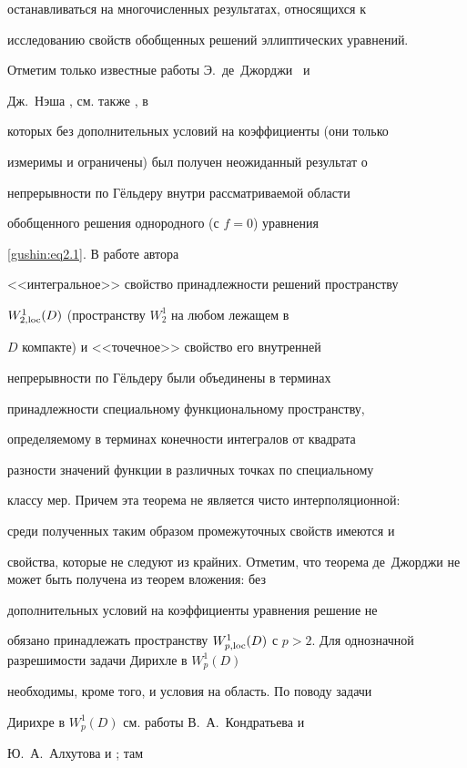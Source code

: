 останавливаться на многочисленных результатах, относящихся к

исследованию свойств обобщенных решений эллиптических уравнений.

Отметим только известные работы Э.~де~Джорджи~\cite{gushin:G} и

Дж.~Нэша \cite{gushin:Nash}, см. также \cite{gushin:Mos},  в

которых без дополнительных условий на коэффициенты (они только

измеримы и ограничены) был получен неожиданный результат о

непрерывности по Гёльдеру внутри рассматриваемой области

обобщенного решения однородного (с $f = 0$) уравнения

\eqref{gushin:eq2.1}. В работе автора \cite{gushin:GSM05}

<<интегральное>> свойство принадлежности решений пространству

$W_{2, {\rm loc}}^1 (D)$ (пространству $W_2^1$ на любом лежащем в

$D$ компакте) и <<точечное>>  свойство его внутренней

непрерывности по Гёльдеру были объединены в терминах

принадлежности специальному функциональному пространству,

определяемому в терминах конечности интегралов от квадрата

разности значений функции в различных точках по специальному

классу мер. Причем эта теорема не является чисто интерполяционной:

среди полученных таким образом промежуточных свойств имеются и

свойства, которые не следуют из крайних. Отметим, что теорема де~Джорджи не может быть получена из теорем вложения: без

дополнительных условий на коэффициенты уравнения решение не

обязано принадлежать пространству $W_{p, {\rm loc}}^1 (D)$ с $p >

2$. Для однозначной разрешимости задачи Дирихле в $W_{p}^1 (D)$

необходимы, кроме того, и условия на область. По поводу задачи

Дирихре в $W_{p}^1 (D)$ см. работы В.~А.~Кондратьева и

Ю.~А.~Алхутова \cite{gushin:KonAlh} и \cite{gushin:Alhutov}; там

